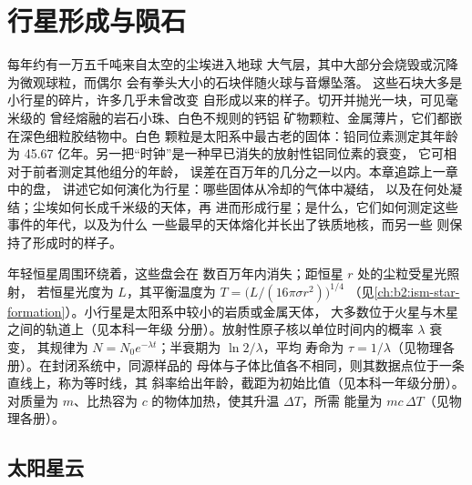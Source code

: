\chapter{行星形成与陨石}\label{ch:b2:planet-formation-meteorites}

每年约有一万五千吨来自太空的尘埃进入地球
大气层，其中大部分会烧毁或沉降为微观球粒，而偶尔
会有拳头大小的石块伴随火球与音爆坠落。
这些石块大多是小行星的碎片，许多几乎未曾改变
自形成以来的样子。切开并抛光一块，可见毫米级的
曾经熔融的岩石小珠、白色不规则的钙铝
矿物颗粒、金属薄片，它们都嵌在深色细粒胶结物中。白色
颗粒是太阳系中最古老的固体：铅同位素测定其年龄为
45.67 亿年。另一把“时钟”是一种早已消失的放射性铝同位素的衰变，
它可相对于前者测定其他组分的年龄，
误差在百万年的几分之一以内。本章追踪上一章中的盘，
讲述它如何演化为行星：哪些固体从冷却的气体中凝结，
以及在何处凝结；尘埃如何长成千米级的天体，再
进而形成行星；是什么，它们如何测定这些事件的年代，以及为什么
一些最早的天体熔化并长出了铁质地核，而另一些
则保持了形成时的样子。

\begin{recall}
年轻恒星周围环绕着，这些盘会在
数百万年内消失；距恒星 $r$ 处的尘粒受星光照射，
若恒星光度为 $L$，其平衡温度为 $T = \bigl(L/(16\pi\sigma r^2)\bigr)^{1/4}$
（见\cref{ch:b2:ism-star-formation}）。小行星是太阳系中较小的岩质或金属天体，
大多数位于火星与木星之间的轨道上（见本科一年级
分册）。放射性原子核以单位时间内的概率 $\lambda$ 衰变，
其规律为 $N = N_0 e^{-\lambda t}$；半衰期为 $\ln 2/\lambda$，平均
寿命为 $\tau = 1/\lambda$（见物理各册）。在封闭系统中，同源样品的
母体与子体比值各不相同，则其数据点位于一条直线上，称为等时线，其
斜率给出年龄，截距为初始比值（见本科一年级分册）。
对质量为 $m$、比热容为 $c$ 的物体加热，使其升温 $\Delta T$，所需
能量为 $mc\,\Delta T$（见物理各册）。
\end{recall}

\section{太阳星云}

